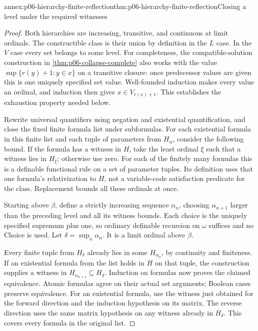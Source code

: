 \begin{annexitem}{annex:p06-hierarchy-finite-reflection}{thm:p06-hierarchy-finite-reflection}{Closing a level under the required witnesses}
\begin{proof}
Both hierarchies are increasing, transitive, and continuous at
limit ordinals. The constructible class is their union by
definition in the \(L\) case.
In the \(V\) case every set belongs to some level.
For completeness, the compatible-solution construction in
\cref{thm:p06-collapse-complete} also works with the value
\(\sup\{r(y)+1:y\in x\}\) on a transitive closure:
once predecessor values are given this is one uniquely specified
set value. Well-founded induction makes every value an ordinal,
and induction then gives \(x\in V_{r(x)+1}\).
This establishes the exhaustion property needed below.

Rewrite universal quantifiers using negation and existential
quantification, and close the fixed finite formula list under
subformulas. For each existential formula in this finite list
and each tuple of parameters from \(H_\alpha\), consider the
following bound. If the formula has a witness in \(H\), take
the least ordinal \(\xi\) such that a witness lies in \(H_\xi\);
otherwise use zero.
For each of the finitely many formulas this is a definable
functional rule on a set of parameter tuples.
Its definition uses that one formula's relativization to \(H\),
not a variable-code satisfaction predicate for the class.
Replacement bounds all these ordinals at once.

Starting above \(\beta\), define a strictly increasing sequence
\(\alpha_n\), choosing \(\alpha_{n+1}\) larger than the preceding
level and all its witness bounds.
Each choice is the uniquely specified supremum plus one,
so ordinary definable recursion on \(\omega\) suffices and
no Choice is used. Let \(\delta=\sup_n\alpha_n\).
It is a limit ordinal above \(\beta\).

Every finite tuple from \(H_\delta\) already lies in some
\(H_{\alpha_n}\), by continuity and finiteness.
If an existential formula from the list holds in \(H\) on
that tuple, the construction supplies a witness in
\(H_{\alpha_{n+1}}\subseteq H_\delta\).
Induction on formulas now proves the claimed equivalence.
Atomic formulas agree on their actual set arguments;
Boolean cases preserve equivalence.
For an existential formula, use the witness just obtained
for the forward direction and the induction hypothesis on
its matrix. The reverse direction uses the same matrix
hypothesis on any witness already in \(H_\delta\).
This covers every formula in the original list.
\end{proof}
\end{annexitem}

